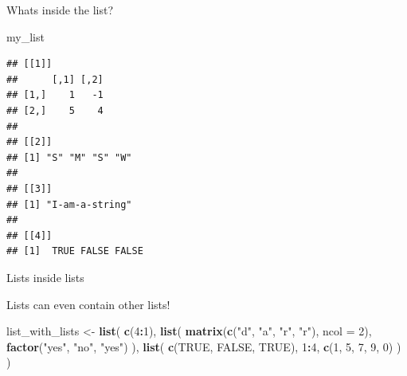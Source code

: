 \documentclass[ignorenonframetext,]{beamer}
\newenvironment{Shaded}{\begin{snugshade}}{\end{snugshade}}
\newcommand{\DataTypeTok}[1]{\textcolor[rgb]{0.13,0.29,0.53}{#1}}
\newcommand{\DecValTok}[1]{\textcolor[rgb]{0.00,0.00,0.81}{#1}}
\newcommand{\KeywordTok}[1]{\textcolor[rgb]{0.13,0.29,0.53}{\textbf{#1}}}
\newcommand{\NormalTok}[1]{#1}
\newcommand{\OperatorTok}[1]{\textcolor[rgb]{0.81,0.36,0.00}{\textbf{#1}}}
\newcommand{\OtherTok}[1]{\textcolor[rgb]{0.56,0.35,0.01}{#1}}
\newcommand{\StringTok}[1]{\textcolor[rgb]{0.31,0.60,0.02}{#1}}
\begin{document}
\begin{frame}[fragile]{Whats inside the list?}
\protect\hypertarget{whats-inside-the-list}{}

\begin{Shaded}
\begin{Highlighting}[]
\NormalTok{my_list}
\end{Highlighting}
\end{Shaded}

\begin{verbatim}
## [[1]]
##      [,1] [,2]
## [1,]    1   -1
## [2,]    5    4
## 
## [[2]]
## [1] "S" "M" "S" "W"
## 
## [[3]]
## [1] "I-am-a-string"
## 
## [[4]]
## [1]  TRUE FALSE FALSE
\end{verbatim}

\end{frame}

\begin{frame}[fragile]{Lists inside lists}
\protect\hypertarget{lists-inside-lists}{}

Lists can even contain other lists!

\begin{Shaded}
\begin{Highlighting}[]
\NormalTok{list_with_lists <-}\StringTok{ }\KeywordTok{list}\NormalTok{(}
  \KeywordTok{c}\NormalTok{(}\DecValTok{4}\OperatorTok{:}\DecValTok{1}\NormalTok{),}
  \KeywordTok{list}\NormalTok{(}
    \KeywordTok{matrix}\NormalTok{(}\KeywordTok{c}\NormalTok{(}\StringTok{"d"}\NormalTok{, }\StringTok{"a"}\NormalTok{, }\StringTok{"r"}\NormalTok{, }\StringTok{"r"}\NormalTok{), }\DataTypeTok{ncol =} \DecValTok{2}\NormalTok{),}
    \KeywordTok{factor}\NormalTok{(}\StringTok{"yes"}\NormalTok{, }\StringTok{"no"}\NormalTok{, }\StringTok{"yes"}\NormalTok{)}
\NormalTok{    ),}
  \KeywordTok{list}\NormalTok{(}
    \KeywordTok{c}\NormalTok{(}\OtherTok{TRUE}\NormalTok{, }\OtherTok{FALSE}\NormalTok{, }\OtherTok{TRUE}\NormalTok{),}
    \DecValTok{1}\OperatorTok{:}\DecValTok{4}\NormalTok{,}
    \KeywordTok{c}\NormalTok{(}\DecValTok{1}\NormalTok{, }\DecValTok{5}\NormalTok{, }\DecValTok{7}\NormalTok{, }\DecValTok{9}\NormalTok{, }\DecValTok{0}\NormalTok{)}
\NormalTok{    )}
\NormalTok{  )}
\end{Highlighting}
\end{Shaded}

\end{frame}
\end{document}

